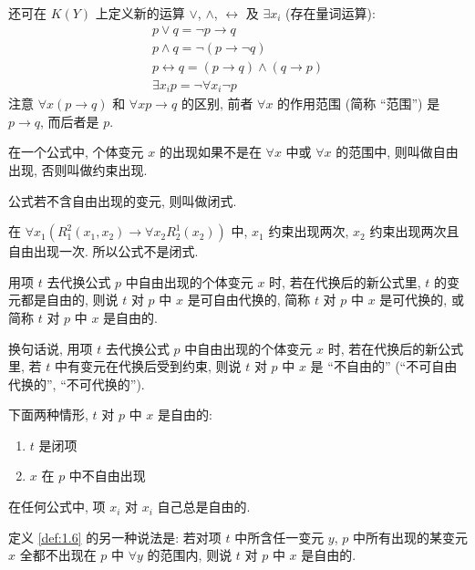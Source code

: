 \documentclass[
    mode=hazy,
    color=blue,
    device=normal,
    lang=cn
]{elegantnote}
\begin{document}
        还可在 $K(Y)$ 上定义新的运算 $\lor$, $\land$, $\leftrightarrow$ 及 $\exists x_i$ (存在量词运算):
        \begin{gather*}
            p\lor q = \lnot p \to q\\
            p\land q = \lnot (p\to \lnot q)\\
            p\leftrightarrow q = (p\to q)\land (q\to p)\\
            \exists x_i p=\lnot \forall x_i \lnot p
        \end{gather*}
        注意 $\forall x(p\to q)$ 和 $\forall xp\to q$ 的区别, 前者 $\forall x$ 的作用范围 (简称 ``范围'') 是 $p\to q$, 而后者是 $p$.
        \begin{definition}[变元的自由出现与约束出现]
            在一个公式中, 个体变元 $x$ 的出现如果不是在 $\forall x$ 中或 $\forall x$ 的范围中, 则叫做自由出现, 否则叫做约束出现.
        \end{definition}
        \begin{definition}
            公式若不含自由出现的变元, 则叫做闭式.
        \end{definition}
        \begin{example}
            在 $\forall x_1 (R_1^2(x_1, x_2)\to \forall x_2 R_2^1(x_2))$ 中, $x_1$ 约束出现两次, $x_2$ 约束出现两次且自由出现一次. 所以公式不是闭式.
        \end{example}
        \begin{definition}\label{def:1.6}
            用项 $t$ 去代换公式 $p$ 中自由出现的个体变元 $x$ 时, 若在代换后的新公式里, $t$ 的变元都是自由的, 则说 $t$ 对 $p$ 中 $x$ 是可自由代换的, 简称 $t$ 对 $p$ 中 $x$ 是可代换的, 或简称 $t$ 对 $p$ 中 $x$ 是自由的.

            换句话说, 用项 $t$ 去代换公式 $p$ 中自由出现的个体变元 $x$ 时, 若在代换后的新公式里, 若 $t$ 中有变元在代换后受到约束, 则说 $t$ 对 $p$ 中 $x$ 是 ``不自由的'' (``不可自由代换的'', ``不可代换的'').
        \end{definition}
        下面两种情形, $t$ 对 $p$ 中 $x$ 是自由的:
        \begin{enumerate}[label = $\arabic*^\circ$]
            \item $t$ 是闭项
            \item $x$ 在 $p$ 中不自由出现
        \end{enumerate}
        在任何公式中, 项 $x_i$ 对 $x_i$ 自己总是自由的.

        定义 \ref{def:1.6} 的另一种说法是: 若对项 $t$ 中所含任一变元 $y$, $p$ 中所有出现的某变元 $x$ 全都不出现在 $p$ 中 $\forall y$ 的范围内, 则说 $t$ 对 $p$ 中 $x$ 是自由的.
\end{document}
